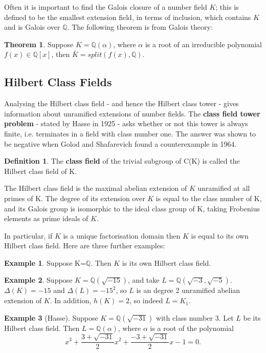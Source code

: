 \documentclass[12pt]{extarticle}
\newcommand{\Q}{\mathbb{Q}}
\newcommand{\spl}{split(f(x),\mathbb{Q})}
\newcommand{\<}{\langle}
\renewcommand{\>}{\rangle}
\theoremstyle{definition}
\newtheorem{theorem}{Theorem}
\newtheorem*{definition}{Definition}
\newtheorem*{example}{Example}
\begin{document}
Often it is important to find the Galois closure of a number field $K$;  this is defined to be the smallest extension field, in terms of inclusion, which contains $K$ and is Galois over $\Q$. The following theorem is from Galois theory:
 \begin{theorem}
  Suppose $K=\Q(\alpha)$, where $\alpha$ is a root of an irreducible polynomial $f(x) \in \Q[x]$, then $\bar{K} = \spl$.
\end{theorem}


\subsection{Hilbert Class Fields}
Analysing the Hilbert class field - and hence the Hilbert class tower - gives information about unramified extensions of number fields. The \textbf{class
field tower problem} - stated by Hasse in 1925 -  asks whether or not this tower is always finite, i.e. terminates in a field with class number one. The answer was shown to be negative when
Golod and Shafarevich found a counterexample in 1964. 
\begin{definition}
The \textbf{class field} of the trivial subgroup of C(K) is called the Hilbert class field of K. 
\end{definition}
The Hilbert class field is the maximal abelian extension of $K$ unramified at all primes of K. The degree of its extension over $K$ is equal to the class number of K, and its Galois group is isomorphic to the ideal class group of K, taking Frobenius elements as prime ideals of $K$. \par
In particular, if $K$ is a unique factorisation domain then $K$ is equal to its own Hilbert class field. 
Here are three further examples:
\begin{example}
    Suppose K=$\Q$. Then $K$ is its own Hilbert class field. 
\end{example}
\begin{example}
    Suppose $K=\Q\left(\sqrt{-15}\right)$, and take $L=\Q\left(\sqrt{-3},\sqrt{-5}\right)$.  $\Delta(K) = -15$ and $\Delta(L) = -15^2$, so $L$ is an degree 2 unramified abelian extension of $K$. In addition, $h(K)=2$, so indeed $L=K_1$.  
\end{example}
\begin{example}[Hasse]
    Suppose $K=\Q\left(\sqrt{-31}\right)$ with class number 3. Let $L$ be its Hilbert class field. Then $L = \Q(\alpha)$, where $\alpha$ is a root of the polynomial 
    \begin{equation}
        x^3+\frac{3+\sqrt{-31}}{2}x^2+\frac{-3+\sqrt{-31}}{2}x -1 =0.
    \end{equation}
\end{example}
\end{document}
